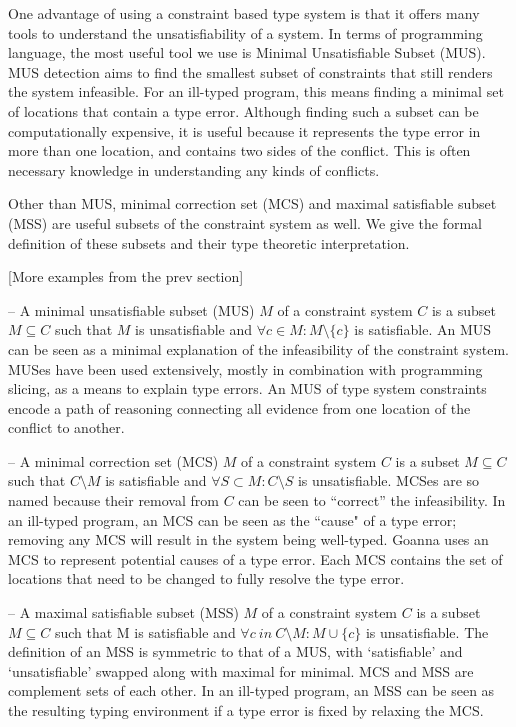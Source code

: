 One advantage of using a constraint based type system is that it offers many tools to understand the unsatisfiability of a system. In terms of programming language, the most useful tool we use is Minimal Unsatisfiable Subset (MUS).  MUS detection aims to find the smallest subset of constraints that still renders the system infeasible. For an ill-typed program, this means finding a minimal set of locations that contain a type error. Although finding such a subset can be computationally expensive, it is useful because it represents the type error in more than one location, and contains two sides of the conflict. This is often necessary knowledge in understanding any kinds of conflicts.


Other than MUS, minimal correction set (MCS) and  maximal satisfiable subset (MSS) are useful subsets of the constraint system as well. We give the formal definition of these subsets and their type theoretic interpretation.


[More examples from the prev section]


– A minimal unsatisfiable subset (MUS) $M$ of a constraint system $C$ is a subset $M \subseteq C$ such that $M$ is unsatisfiable and $ \forall{c} \in M : M \setminus \{c\}$ is satisfiable. An MUS can be seen as a minimal explanation of the infeasibility of the constraint system. MUSes have been used extensively, mostly in combination with programming slicing, as a means to explain type errors. An MUS of type system constraints encode a path of reasoning connecting all evidence from one location of the conflict to another.


– A minimal correction set (MCS) $M$ of a constraint system $C$ is a subset $M \subseteq C$ such that $C \setminus M$ is satisfiable and $\forall{S} \subset M : C \setminus S$ is unsatisfiable. MCSes are so named because their removal from $C$ can be seen to “correct” the infeasibility. In an ill-typed program, an MCS can be seen as the ``cause" of a type error; removing any MCS will result in the system being well-typed. Goanna uses an MCS to represent potential causes of a type error. Each MCS contains the set of locations that need to be changed to fully resolve the type error.

  

– A maximal satisfiable subset (MSS) $M$ of a constraint system $C$ is a subset $M \subseteq C$ such that M is satisfiable and $\forall{c}\ in\ C \setminus M:M\cup\{c\}$ is unsatisfiable. The definition of an MSS is symmetric to that of a MUS, with `satisfiable' and `unsatisfiable' swapped along with maximal for minimal. MCS and MSS are complement sets of each other. In an ill-typed program, an MSS can be seen as the resulting typing environment if a type error is fixed by relaxing the MCS.

